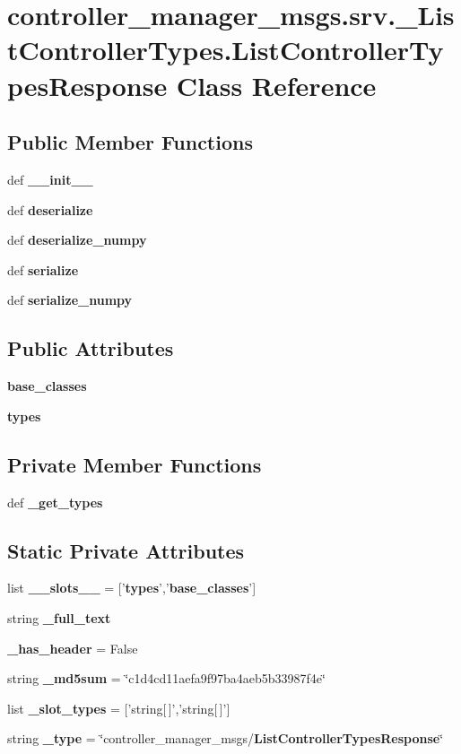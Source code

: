 \section{controller\-\_\-manager\-\_\-msgs.\-srv.\-\_\-\-List\-Controller\-Types.\-List\-Controller\-Types\-Response \-Class \-Reference}
\label{classcontroller__manager__msgs_1_1srv_1_1__ListControllerTypes_1_1ListControllerTypesResponse}
\subsection*{\-Public \-Member \-Functions}
\begin{DoxyCompactItemize}
\item 
def {\bf \-\_\-\-\_\-init\-\_\-\-\_\-}
\item 
def {\bf deserialize}
\item 
def {\bf deserialize\-\_\-numpy}
\item 
def {\bf serialize}
\item 
def {\bf serialize\-\_\-numpy}
\end{DoxyCompactItemize}
\subsection*{\-Public \-Attributes}
\begin{DoxyCompactItemize}
\item 
{\bf base\-\_\-classes}
\item 
{\bf types}
\end{DoxyCompactItemize}
\subsection*{\-Private \-Member \-Functions}
\begin{DoxyCompactItemize}
\item 
def {\bf \-\_\-get\-\_\-types}
\end{DoxyCompactItemize}
\subsection*{\-Static \-Private \-Attributes}
\begin{DoxyCompactItemize}
\item 
list {\bf \-\_\-\-\_\-slots\-\_\-\-\_\-} = ['{\bf types}','{\bf base\-\_\-classes}']
\item 
string {\bf \-\_\-full\-\_\-text}
\item 
{\bf \-\_\-has\-\_\-header} = \-False
\item 
string {\bf \-\_\-md5sum} = \char`\"{}c1d4cd11aefa9f97ba4aeb5b33987f4e\char`\"{}
\item 
list {\bf \-\_\-slot\-\_\-types} = ['string[$\,$]','string[$\,$]']
\item 
string {\bf \-\_\-type} = \char`\"{}controller\-\_\-manager\-\_\-msgs/{\bf \-List\-Controller\-Types\-Response}\char`\"{}
\end{DoxyCompactItemize}


